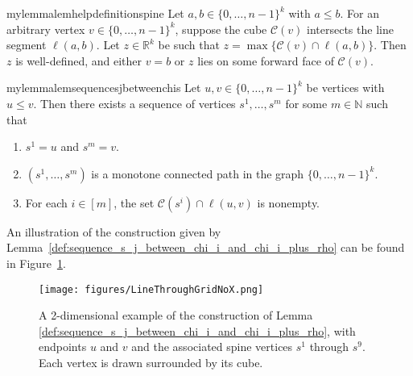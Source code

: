 \documentclass[11pt]{article}
\begin{document}
\begin{restatable}{mylemma}{lemhelpdefinitionspine}
\label{lem:help_definition_spine}
Let $a,b \in \{0,\ldots, n-1\}^k$ with $a \leq b$. 
For an arbitrary vertex $v \in \{0, \ldots, n-1\}^k$, suppose the cube $\mathcal{C}(v)$ intersects the line segment $\ell(a, b)$. Let $z \in \mathbb{R}^k$ be such that   $z = \max \{\mathcal{C}(v) \cap \ell(a, b)\}$. Then $z$ is well-defined, and either $v=b$ or $z$ lies on some forward face of $\mathcal{C}(v)$.
\end{restatable}
\begin{restatable}{mylemma}{lemsequencesjbetweenchis}
\label{def:sequence_s_j_between_chi_i_and_chi_i_plus_rho}
Let   $u,v \in \{0, \ldots, n-1\}^k$ be vertices with $u \leq v$. Then there exists a sequence of vertices $s^1, \ldots, s^m$ for some $m \in \mathbb{N}$ such that  
\begin{enumerate}
    \item $s^1 = u$ and $s^m = v$.
    \item $(s^1, \ldots, s^m)$ is a monotone connected path in the graph $\{0, \ldots, n-1\}^k$.
    \item For each $i \in [m]$, the set $\mathcal{C}(s^i) \cap \ell(u, v)$ is nonempty.
\end{enumerate}
\end{restatable}
An illustration of the construction given by Lemma~\ref{def:sequence_s_j_between_chi_i_and_chi_i_plus_rho} can be found in Figure~\ref{fig:line-through-grid_main}.

\begin{figure}[h!]
\centering 
\texttt{[image: figures/LineThroughGridNoX.png]}
\caption{A 2-dimensional example of the construction of Lemma \ref{def:sequence_s_j_between_chi_i_and_chi_i_plus_rho}, with endpoints $u$ and $v$ and the associated spine vertices $s^1$ through $s^9$. Each vertex is drawn surrounded by its cube.}
\label{fig:line-through-grid_main}
\end{figure}
\end{document}
